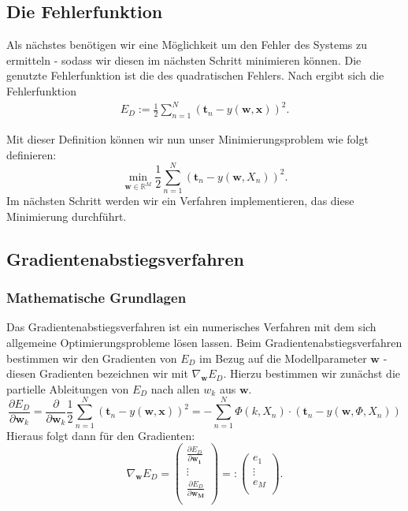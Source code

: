 \documentclass{article}
\theoremstyle{plain} %
\theoremstyle{definition} %
\begin{document}
\subsection{Die Fehlerfunktion}

Als nächstes benötigen wir eine Möglichkeit um den Fehler des Systems zu ermitteln - sodass wir diesen im nächsten Schritt minimieren können. Die genutzte Fehlerfunktion ist die des quadratischen Fehlers. Nach \cite[S. 140f]{Bishop} ergibt sich die Fehlerfunktion
\begin{align}
    E_D := \frac{1}{2}\sum_{n=1}^{N}(\mathbf{t}_n - y(\mathbf{w}, \mathbf{x}))^2.
\end{align}

Mit dieser Definition können wir nun unser Minimierungsproblem wie folgt definieren:
$$
  \min_{\mathbf{w} \in \mathbb{R}^M} \frac{1}{2}\sum_{n=1}^{N}(\mathbf{t}_n - y(\mathbf{w}, X_n))^2.
$$
Im nächsten Schritt werden wir ein Verfahren implementieren, das diese Minimierung durchführt.

\subsection{Gradientenabstiegsverfahren}

\subsubsection{Mathematische Grundlagen}

Das Gradientenabstiegsverfahren ist ein numerisches Verfahren mit dem sich allgemeine Optimierungsprobleme lösen lassen. Beim Gradientenabstiegsverfahren bestimmen wir den Gradienten von $E_D$ im Bezug auf die Modellparameter $\mathbf{w}$ - diesen Gradienten bezeichnen wir mit $\nabla_\mathbf{w} E_D$. Hierzu bestimmen wir zunächst die partielle Ableitungen von $E_D$ nach allen $w_k$ aus $\mathbf{w}$.
$$
  \frac{\partial E_D}{\partial \mathbf{w}_k} = \frac{\partial}{\partial \mathbf{w}_k} \frac{1}{2}\sum_{n=1}^{N}(\mathbf{t}_n - y(\mathbf{w}, \mathbf{x}))^2 = - \sum_{n=1}^N \Phi(k, X_n) \cdot (\mathbf{t}_n - y(\mathbf{w}, \Phi, X_n))
$$
Hieraus folgt dann für den Gradienten:
$$
  \nabla_\mathbf{w} E_D
    = \left( \begin{array}{c}
      \frac{\partial E_D}{\partial \mathbf{w_1}}\\
      \vdots\\
      \frac{\partial E_D}{\partial \mathbf{w_M}}\\
      \end{array} \right)
    =: \left( \begin{array}{c}
      e_1\\
      \vdots\\
      e_M\\
      \end{array} \right).
$$
\end{document}
